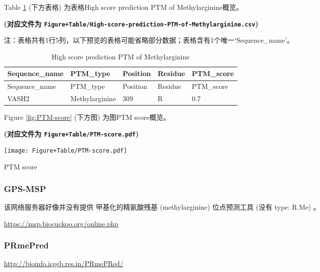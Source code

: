 \documentclass[
]{article}
\begin{document}
Table \ref{tab:High-score-prediction-PTM-of-Methylarginine} (下方表格) 为表格High score prediction PTM of Methylarginine概览。

\textbf{(对应文件为 \texttt{Figure+Table/High-score-prediction-PTM-of-Methylarginine.csv})}

\begin{center}\begin{tcolorbox}[colback=gray!10, colframe=gray!50, width=0.9\linewidth, arc=1mm, boxrule=0.5pt]注：表格共有1行5列，以下预览的表格可能省略部分数据；表格含有1个唯一`Sequence\_name'。
\end{tcolorbox}
\end{center}

\begin{longtable}[]{@{}lllll@{}}
\caption{\label{tab:High-score-prediction-PTM-of-Methylarginine}High score prediction PTM of Methylarginine}\tabularnewline
\toprule
Sequence\_name & PTM\_type & Position & Residue & PTM\_score\tabularnewline
\midrule
\endfirsthead
\toprule
Sequence\_name & PTM\_type & Position & Residue & PTM\_score\tabularnewline
\midrule
\endhead
VASH2 & Methylarginine & 309 & R & 0.7\tabularnewline
\bottomrule
\end{longtable}

Figure \ref{fig:PTM-score} (下方图) 为图PTM score概览。

\textbf{(对应文件为 \texttt{Figure+Table/PTM-score.pdf})}

\def\@captype{figure}
\begin{center}
\texttt{[image: Figure+Table/PTM-score.pdf]}
\caption{PTM score}\label{fig:PTM-score}
\end{center}

\hypertarget{gps-msp}{%
\subsubsection{GPS-MSP}\label{gps-msp}}

该网络服务器好像并没有提供 甲基化的精氨酸残基 (methylarginine) 位点预测工具 (没有 type: R.Me) 。

\url{https://msp.biocuckoo.org/online.php}

\hypertarget{prmepred}{%
\subsubsection{PRmePred}\label{prmepred}}

\url{http://bioinfo.icgeb.res.in/PRmePRed/}
\end{document}
